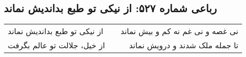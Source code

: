 \begin{center}
\section*{رباعی شماره ۵۲۷: از نیکی تو طبع بداندیش نماند}
\label{sec:0527}
\begin{longtable}{l p{0.5cm} r}
از نیکی تو طبع بداندیش نماند
&&
نی غصه و نی غم نه کم و بیش نماند
\\
از خیل، جلالت تو عالم بگرفت
&&
تا جمله ملک شدند و درویش نماند
\\
\end{longtable}
\end{center}
